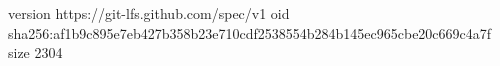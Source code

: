 version https://git-lfs.github.com/spec/v1
oid sha256:af1b9c895e7eb427b358b23e710cdf2538554b284b145ec965cbe20c669c4a7f
size 2304
